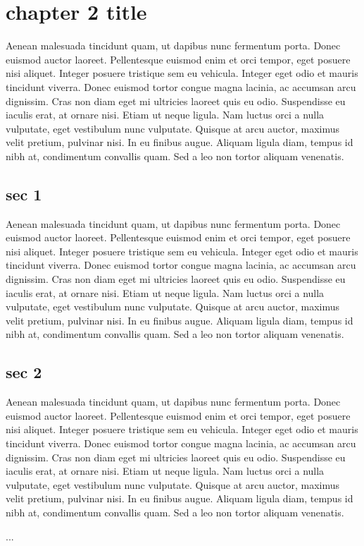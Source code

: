 \chapter{chapter 2 title}

Aenean malesuada tincidunt quam, ut dapibus nunc fermentum porta. Donec euismod auctor laoreet. Pellentesque euismod enim et orci tempor, eget posuere nisi aliquet. Integer posuere tristique sem eu vehicula. Integer eget odio et mauris tincidunt viverra. Donec euismod tortor congue magna lacinia, ac accumsan arcu dignissim. Cras non diam eget mi ultricies laoreet quis eu odio. Suspendisse eu iaculis erat, at ornare nisi. Etiam ut neque ligula. Nam luctus orci a nulla vulputate, eget vestibulum nunc vulputate. Quisque at arcu auctor, maximus velit pretium, pulvinar nisi. In eu finibus augue. Aliquam ligula diam, tempus id nibh at, condimentum convallis quam. Sed a leo non tortor aliquam venenatis.


\section{sec 1}
Aenean malesuada tincidunt quam, ut dapibus nunc fermentum porta. Donec euismod auctor laoreet. Pellentesque euismod enim et orci tempor, eget posuere nisi aliquet. Integer posuere tristique sem eu vehicula. Integer eget odio et mauris tincidunt viverra. Donec euismod tortor congue magna lacinia, ac accumsan arcu dignissim. Cras non diam eget mi ultricies laoreet quis eu odio. Suspendisse eu iaculis erat, at ornare nisi. Etiam ut neque ligula. Nam luctus orci a nulla vulputate, eget vestibulum nunc vulputate. Quisque at arcu auctor, maximus velit pretium, pulvinar nisi. In eu finibus augue. Aliquam ligula diam, tempus id nibh at, condimentum convallis quam. Sed a leo non tortor aliquam venenatis.

\section{sec 2}
Aenean malesuada tincidunt quam, ut dapibus nunc fermentum porta. Donec euismod auctor laoreet. Pellentesque euismod enim et orci tempor, eget posuere nisi aliquet. Integer posuere tristique sem eu vehicula. Integer eget odio et mauris tincidunt viverra. Donec euismod tortor congue magna lacinia, ac accumsan arcu dignissim. Cras non diam eget mi ultricies laoreet quis eu odio. Suspendisse eu iaculis erat, at ornare nisi. Etiam ut neque ligula. Nam luctus orci a nulla vulputate, eget vestibulum nunc vulputate. Quisque at arcu auctor, maximus velit pretium, pulvinar nisi. In eu finibus augue. Aliquam ligula diam, tempus id nibh at, condimentum convallis quam. Sed a leo non tortor aliquam venenatis.

...